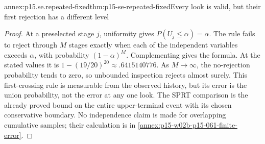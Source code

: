 \begin{annexitem}{annex:p15.se.repeated-fixed}{thm:p15-se-repeated-fixed}{Every look is valid, but their first rejection has a different level}
\begin{proof}
At a preselected stage \(j\), uniformity gives
\(P(U_j\leq\alpha)=\alpha\). The rule fails to reject through
\(M\) stages exactly when each of the independent variables exceeds
\(\alpha\), with probability \((1-\alpha)^M\). Complementing gives
the formula. At the stated values it is
\(1-(19/20)^{20}\approx.6415140776\). As \(M\to\infty\),
the no-rejection probability tends to zero, so unbounded inspection
rejects almost surely. This first-crossing rule is measurable from the
observed history, but its error is the union probability, not the error
at any one look. The SPRT comparison is the already proved bound on
the entire upper-terminal event with its chosen conservative boundary.
No independence claim is made for overlapping cumulative samples; their
calculation is in \cref{annex:p15-w02b-p15-061-finite-error}.
\end{proof}
\end{annexitem}

